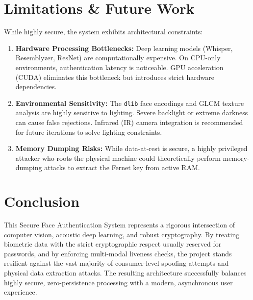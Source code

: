 \documentclass[12pt,a4paper]{article}
\begin{document}
\section{Limitations \& Future Work}
While highly secure, the system exhibits architectural constraints:
\begin{enumerate}
    \item \textbf{Hardware Processing Bottlenecks:} Deep learning models (Whisper, Resemblyzer, ResNet) are computationally expensive. On CPU-only environments, authentication latency is noticeable. GPU acceleration (CUDA) eliminates this bottleneck but introduces strict hardware dependencies.
    \item \textbf{Environmental Sensitivity:} The \texttt{dlib} face encodings and GLCM texture analysis are highly sensitive to lighting. Severe backlight or extreme darkness can cause false rejections. Infrared (IR) camera integration is recommended for future iterations to solve lighting constraints.
    \item \textbf{Memory Dumping Risks:} While data-at-rest is secure, a highly privileged attacker who roots the physical machine could theoretically perform memory-dumping attacks to extract the Fernet key from active RAM.
\end{enumerate}

\section{Conclusion}
This Secure Face Authentication System represents a rigorous intersection of computer vision, acoustic deep learning, and robust cryptography. By treating biometric data with the strict cryptographic respect usually reserved for passwords, and by enforcing multi-modal liveness checks, the project stands resilient against the vast majority of consumer-level spoofing attempts and physical data extraction attacks. The resulting architecture successfully balances highly secure, zero-persistence processing with a modern, asynchronous user experience.
\end{document}

